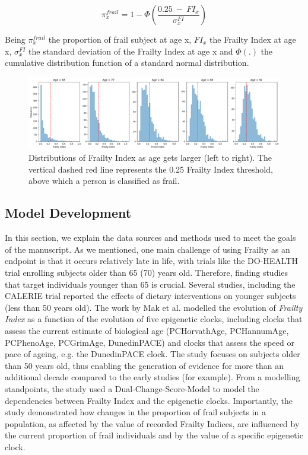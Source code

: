 \begin{equation}
\pi_{x}^{frail} = 1 - \Phi\left( \frac{0.25\  - \ {FI}_{x}}{\sigma_{x}^{FI}} \right)
\end{equation}

Being $\pi_{x}^{frail}$ the proportion of frail subject at age x, ${FI}_{x}$ the Frailty Index at age x, $\sigma_{x}^{FI}$ the standard deviation of the Frailty Index at age x and $\Phi(.)$ the cumulative distribution function of a standard normal distribution.

\begin{figure}[h]
\centering
\includegraphics[width=\textwidth]{figures/Figure2.png}
\caption{Distributions of Frailty Index as age gets larger (left to right). The vertical dashed red line represents the 0.25 Frailty Index threshold, above which a person is classified as frail.}
\label{fig:frailty_distribution}
\end{figure}

\subsection{Model Development}

In this section, we explain the data sources and methods used to meet the goals of the manuscript. As we mentioned, one main challenge of using Frailty as an endpoint is that it occurs relatively late in life, with trials like the DO-HEALTH trial enrolling subjects older than 65 (70) years old\cite{McNeil2018}. Therefore, finding studies that target individuals younger than 65 is crucial. Several studies, including the CALERIE trial reported the effects of dietary interventions on younger subjects (less than 50 years old)\cite{Waziry2023}. The work by Mak et al.\cite{Mak2023} modelled the evolution of \textit{Frailty Index} as a function of the evolution of five epigenetic clocks, including clocks that assess the current estimate of biological age (PCHorvathAge, PCHannumAge, PCPhenoAge, PCGrimAge, DunedinPACE) and clocks that assess the speed or pace of ageing, e.g. the DunedinPACE clock. The study focuses on subjects older than 50 years old, thus enabling the generation of evidence for more than an additional decade compared to the early studies (for example\cite{McNeil2018}). From a modelling standpoints, the study used a Dual-Change-Score-Model\cite{Wiedemann2022} to model the dependencies between Frailty Index and the epigenetic clocks. Importantly, the study demonstrated how changes in the proportion of frail subjects in a population, as affected by the value of recorded Frailty Indices, are influenced by the current proportion of frail individuals and by the value of a specific epigenetic clock.

